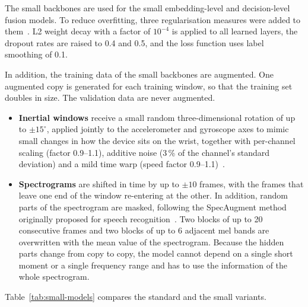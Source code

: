 The small backbones are used for the small embedding-level and decision-level
fusion models. To reduce overfitting, three regularisation measures were added to
them~\cite{srivastava2014dropout, szegedy2016rethinking}. L2 weight decay with a factor of $10^{-4}$ is applied to all
learned layers, the dropout rates are raised to 0.4 and 0.5, and the loss function
uses label smoothing of 0.1.

In addition, the training data of the small backbones are augmented. One
augmented copy is generated for each training window, so that the training set
doubles in size. The validation data are never augmented.

\begin{itemize}
  \item \textbf{Inertial windows} receive a small random three-dimensional rotation
  of up to $\pm 15^\circ$, applied jointly to the accelerometer and gyroscope axes
  to mimic small changes in how the device sits on the wrist, together with
  per-channel scaling (factor 0.9--1.1), additive noise (3\,\% of the channel's
  standard deviation) and a mild time warp (speed factor 0.9--1.1)~\cite{um2017data}.
  \item \textbf{Spectrograms} are shifted in time by up to $\pm 10$ frames, with
  the frames that leave one end of the window re-entering at the other. In
  addition, random parts of the spectrogram are masked, following the SpecAugment
  method originally proposed for speech recognition~\cite{park2019specaugment}. Two blocks of
  up to 20 consecutive frames and two blocks of up to 6 adjacent mel bands are
  overwritten with the mean value of the spectrogram. Because the hidden parts
  change from copy to copy, the model cannot depend on a single short moment or a
  single frequency range and has to use the information of the whole spectrogram.
\end{itemize}

Table~\ref{tab:small-models} compares the standard and the small variants.


